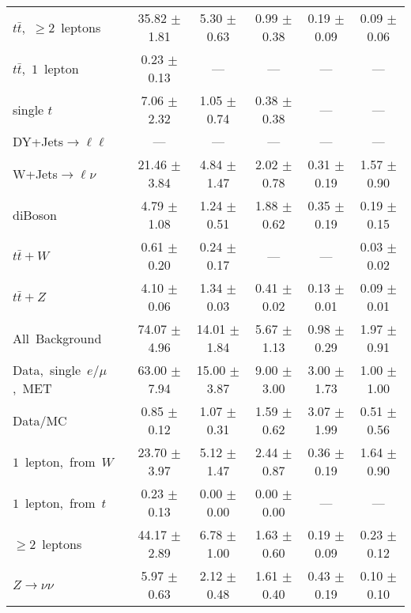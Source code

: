 \documentclass{article}
\begin{document}
\begin{longtable}{|l|c|c|c|c|c|}
$t\bar{t}$,~$\ge2$~leptons & 35.82 $\pm$ 1.81  & 5.30 $\pm$ 0.63  & 0.99 $\pm$ 0.38  & 0.19 $\pm$ 0.09  & 0.09 $\pm$ 0.06 \\* 
$t\bar{t}$,~$1$~lepton & 0.23 $\pm$ 0.13  & ---  & ---  & ---  & --- \\* 
single $t$  & 7.06 $\pm$ 2.32  & 1.05 $\pm$ 0.74  & 0.38 $\pm$ 0.38  & ---  & --- \\* 
DY+Jets$\rightarrow\ell\ell$  & ---  & ---  & ---  & ---  & --- \\* 
W+Jets$\rightarrow\ell\nu$  & 21.46 $\pm$ 3.84  & 4.84 $\pm$ 1.47  & 2.02 $\pm$ 0.78  & 0.31 $\pm$ 0.19  & 1.57 $\pm$ 0.90 \\* 
diBoson  & 4.79 $\pm$ 1.08  & 1.24 $\pm$ 0.51  & 1.88 $\pm$ 0.62  & 0.35 $\pm$ 0.19  & 0.19 $\pm$ 0.15 \\* 
$t\bar{t}+W$  & 0.61 $\pm$ 0.20  & 0.24 $\pm$ 0.17  & ---  & ---  & 0.03 $\pm$ 0.02 \\* 
$t\bar{t}+Z$  & 4.10 $\pm$ 0.06  & 1.34 $\pm$ 0.03  & 0.41 $\pm$ 0.02  & 0.13 $\pm$ 0.01  & 0.09 $\pm$ 0.01 \\* 
\hline \hline 
All~Background  & 74.07 $\pm$ 4.96  & 14.01 $\pm$ 1.84  & 5.67 $\pm$ 1.13  & 0.98 $\pm$ 0.29  & 1.97 $\pm$ 0.91 \\* 
Data,~single~$e/\mu$,~MET  & 63.00 $\pm$ 7.94  & 15.00 $\pm$ 3.87  & 9.00 $\pm$ 3.00  & 3.00 $\pm$ 1.73  & 1.00 $\pm$ 1.00 \\* 
Data/MC  & 0.85 $\pm$ 0.12  & 1.07 $\pm$ 0.31  & 1.59 $\pm$ 0.62  & 3.07 $\pm$ 1.99  & 0.51 $\pm$ 0.56 \\* 
\hline \hline 
$1$~lepton,~from~$W$  & 23.70 $\pm$ 3.97  & 5.12 $\pm$ 1.47  & 2.44 $\pm$ 0.87  & 0.36 $\pm$ 0.19  & 1.64 $\pm$ 0.90 \\* 
$1$~lepton,~from~$t$  & 0.23 $\pm$ 0.13  & 0.00 $\pm$ 0.00  & 0.00 $\pm$ 0.00  & ---  & --- \\* 
$\ge2$~leptons  & 44.17 $\pm$ 2.89  & 6.78 $\pm$ 1.00  & 1.63 $\pm$ 0.60  & 0.19 $\pm$ 0.09  & 0.23 $\pm$ 0.12 \\* 
$Z\rightarrow\nu\nu$  & 5.97 $\pm$ 0.63  & 2.12 $\pm$ 0.48  & 1.61 $\pm$ 0.40  & 0.43 $\pm$ 0.19  & 0.10 $\pm$ 0.10 \\* 
\hline 
\end{longtable} 

 
 
 
 
\pagebreak 

 
 
 
 
\end{document}
